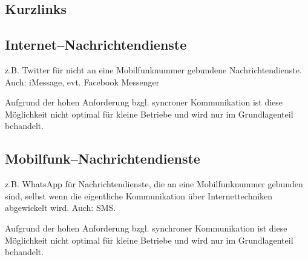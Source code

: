 
\subsection{Kurzlinks} %
\label{sub:kurzlinks}


\subsection{Internet--Nachrichtendienste} %
\label{sub:internet_nachrichtendienste}
z.B. Twitter für nicht an eine Mobilfunknummer gebundene Nachrichtendienste. Auch: iMessage, evt. Facebook Messenger

Aufgrund der hohen Anforderung bzgl. syncroner Kommunikation ist diese Möglichkeit nicht optimal für kleine Betriebe und wird nur im Grundlagenteil behandelt.

\subsection{Mobilfunk--Nachrichtendienste} %
\label{sub:mobilfunk_nachrichtendienste}


z.B. WhatsApp für Nachrichtendienste, die an eine Mobilfunknummer gebunden sind, selbst wenn die eigentliche Kommunikation über Internettechniken abgewickelt wird. Auch: SMS.

Aufgrund der hohen Anforderung bzgl. synchroner Kommunikation ist diese Möglichkeit nicht optimal für kleine Betriebe und wird nur im Grundlagenteil behandelt.



